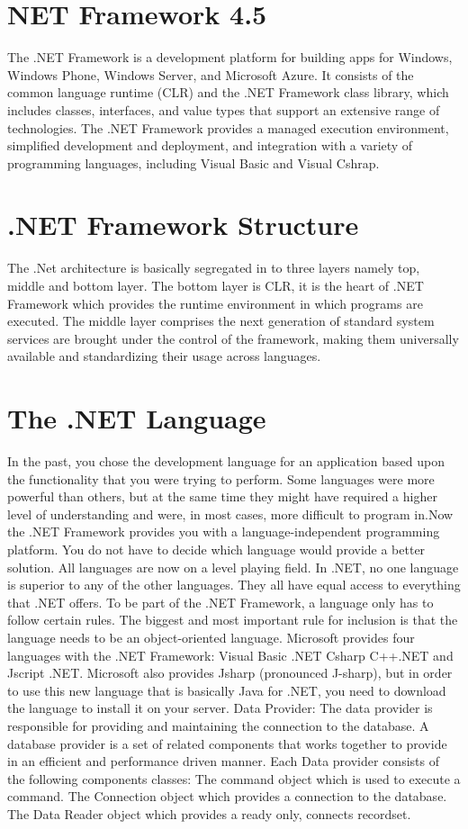 \section{NET Framework 4.5}
The .NET Framework is a development platform for building apps for Windows, Windows Phone, Windows Server, and Microsoft Azure. It consists of the common language runtime (CLR) and the .NET Framework class library, which includes classes, interfaces, and value types that support an extensive range of technologies. The .NET Framework provides a managed execution environment, simplified development and deployment, and integration with a variety of programming languages, including Visual Basic and Visual Cshrap.
\section{.NET Framework Structure}
The .Net architecture is basically segregated in to three layers namely top, middle and bottom layer. The bottom layer is CLR, it is the heart of .NET Framework which provides the runtime environment in which programs are executed. The middle layer comprises the next generation of standard system services are brought under the control of the framework, making them universally available and standardizing their usage across languages.
\section{The .NET Language}
In the past, you chose the development language for an application based upon the functionality that you were trying to perform. Some languages were more powerful than others, but at the same time they might have required a higher level of understanding and were, in most cases, more difficult to program in.Now the .NET Framework provides you with a language-independent programming platform. You do not have to decide which language would provide a better solution. All languages are now on a level playing field. In .NET, no one language is superior to any of the other languages. They all have equal access to everything that .NET offers.
To be part of the .NET Framework, a language only has to follow certain rules. The biggest and most important rule for inclusion is that the language needs to be an object-oriented language. Microsoft provides four languages with the .NET Framework:
Visual Basic .NET
Csharp
C++.NET and
Jscript .NET.
Microsoft also provides Jsharp (pronounced J-sharp), but in order to use this new language that is basically Java for .NET, you need to download the language to install it on your server.
Data Provider:
The data provider is responsible for providing and maintaining the connection to the database. A database provider is a set of related components that works together to provide in an efficient and performance driven manner. Each Data provider consists of the following components classes:
 The command object which is used to execute a command.
 The Connection object which provides a connection to the database.
 The Data Reader object which provides a ready only, connects recordset.
